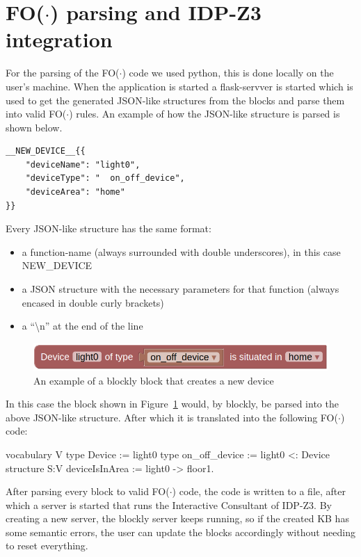 \documentclass[11pt,a4paper]{report}
\newcommand{\fodot}{FO($\cdot$)\xspace}
\begin{document}
\section{\fodot parsing and IDP-Z3 integration}
For the parsing of the \fodot code we used python, this is done locally on the user's machine. When the application is started a flask-servver is started which is used to get the generated JSON-like structures from the blocks and parse them into valid \fodot rules.
An example of how the JSON-like structure is parsed is shown below.
\begin{verbatim}
__NEW_DEVICE__{{
    "deviceName": "light0", 
    "deviceType": "  on_off_device", 
    "deviceArea": "home"
}}
\end{verbatim}
Every JSON-like structure has the same format:
\begin{itemize}
    \item a function-name (always surrounded with double underscores), in this case NEW\_DEVICE
    \item a JSON structure with the necessary parameters for that function (always encased in double curly brackets)
    \item a ``\textbackslash n'' at the end of the line
\end{itemize}

\begin{figure}
    \centering
    \includegraphics[width=0.8\linewidth]{images/blockly_new_device.png}
    \caption{An example of a blockly block that creates a new device}
    \label{fig:blockly_new_device}
\end{figure}

In this case the block shown in Figure~\ref{fig:blockly_new_device} would, by blockly, be parsed into the above JSON-like structure. After which it is translated into the following \fodot code:

\begin{idplisting}
vocabulary V {
    type Device := {light0}
    type on_off_device := {light0} <: Device
}
structure S:V {
    deviceIsInArea := {light0 -> floor1}.
}
\end{idplisting}

After parsing every block to valid \fodot code, the code is written to a file, after which a server is started that runs the Interactive Consultant of IDP-Z3. By creating a new server, the blockly server keeps running, so if the created KB has some semantic errors, the user can update the blocks accordingly without needing to reset everything. 
\end{document}
